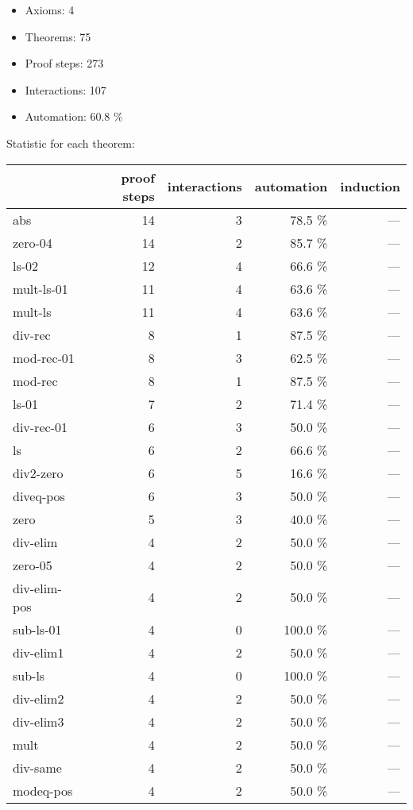 \documentclass[a4paper]{article}
\begin{document}
\raggedright
              
\begin{itemize}
\item Axioms: 4
\item Theorems: 75
\item Proof steps: 273
\item Interactions: 107
\item Automation: 60.8 \%
\end{itemize}


Statistic for each theorem:

\begin{supertabular}{l|r|r|r|r}
	& proof steps & interactions & automation & induction\\ \hline
abs & 14 & 3 & 78.5 \% & ---\\
zero-04 & 14 & 2 & 85.7 \% & ---\\
ls-02 & 12 & 4 & 66.6 \% & ---\\
mult-ls-01 & 11 & 4 & 63.6 \% & ---\\
mult-ls & 11 & 4 & 63.6 \% & ---\\
div-rec & 8 & 1 & 87.5 \% & ---\\
mod-rec-01 & 8 & 3 & 62.5 \% & ---\\
mod-rec & 8 & 1 & 87.5 \% & ---\\
ls-01 & 7 & 2 & 71.4 \% & ---\\
div-rec-01 & 6 & 3 & 50.0 \% & ---\\
ls & 6 & 2 & 66.6 \% & ---\\
div2-zero & 6 & 5 & 16.6 \% & ---\\
diveq-pos & 6 & 3 & 50.0 \% & ---\\
zero & 5 & 3 & 40.0 \% & ---\\
div-elim & 4 & 2 & 50.0 \% & ---\\
zero-05 & 4 & 2 & 50.0 \% & ---\\
div-elim-pos & 4 & 2 & 50.0 \% & ---\\
sub-ls-01 & 4 & 0 & 100.0 \% & ---\\
div-elim1 & 4 & 2 & 50.0 \% & ---\\
sub-ls & 4 & 0 & 100.0 \% & ---\\
div-elim2 & 4 & 2 & 50.0 \% & ---\\
div-elim3 & 4 & 2 & 50.0 \% & ---\\
mult & 4 & 2 & 50.0 \% & ---\\
div-same & 4 & 2 & 50.0 \% & ---\\
modeq-pos & 4 & 2 & 50.0 \% & ---\\

\end{supertabular}
\end{document}
